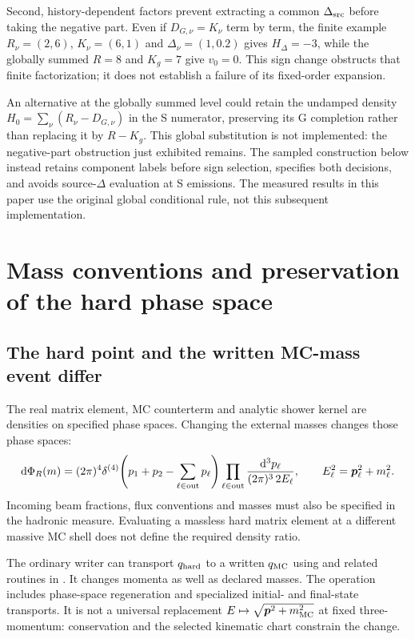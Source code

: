 Second, history-dependent factors prevent extracting a common
$\Delta_{\rm src}$ before taking the negative part.
Even if $D_{G,\nu}=K_\nu$ term by term, the finite example
$R_\nu=(2,6)$, $K_\nu=(6,1)$ and $\Delta_\nu=(1,0.2)$ gives
$H_\Delta=-3$, while the globally summed $R=8$ and $K_g=7$ give
$v_0=0$. This sign change obstructs that finite factorization;
it does not establish a failure of its fixed-order expansion.

An alternative at the globally summed level could retain the undamped density
$H_0=\sum_\nu(R_\nu-D_{G,\nu})$ in the S numerator, preserving its
G completion rather than replacing it by $R-K_g$.
This global substitution is not implemented: the negative-part
obstruction just exhibited remains. The sampled construction below
instead retains component labels before sign selection, specifies both
decisions, and avoids source-$\Delta$ evaluation at S emissions.
The measured results in this paper use the original global conditional
rule, not this subsequent implementation.

\section{Mass conventions and preservation of the hard phase space}
\label{sec:masses-contract}

\subsection{The hard point and the written MC-mass event differ}
\label{sec:masses-shuffle}

The real matrix element, MC counterterm and analytic shower kernel
are densities on specified phase spaces.
Changing the external masses changes those phase spaces:
\begin{equation}
 \mathrm d\Phi_R(m)=
  (2\pi)^4\delta^{(4)}
     \!\left(p_1+p_2-\sum_{\ell\in{\rm out}}p_\ell\right)
  \prod_{\ell\in{\rm out}}
     \frac{\mathrm d^3p_\ell}{(2\pi)^3\,2E_\ell},
 \qquad
 E_\ell^2=\boldsymbol p_\ell^2+m_\ell^2 .
 \label{eq:masses-phase-space}
\end{equation}
Incoming beam fractions, flux conventions and masses must also be
specified in the hadronic measure.
Evaluating a massless hard matrix element at a different massive
MC shell does not define the required density ratio.

The ordinary writer can transport $q_{\rm hard}$ to a written
$q_{\rm MC}$ using  and related routines in
.
It changes momenta as well as declared masses.
The operation includes phase-space regeneration and specialized
initial- and final-state transports.
It is not a universal replacement
$E\mapsto\sqrt{\boldsymbol p^2+m_{\rm MC}^2}$ at fixed three-momentum:
conservation and the selected kinematic chart constrain the change.

